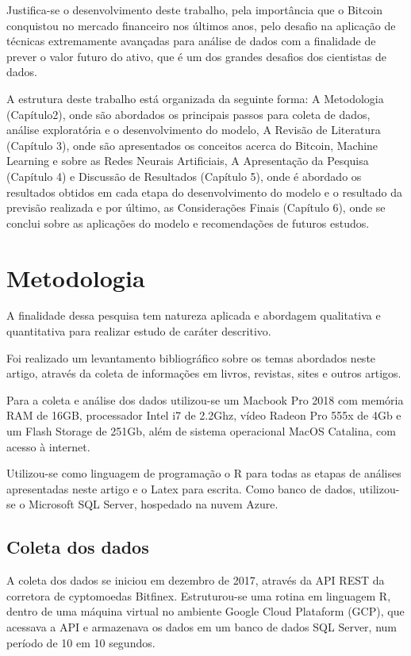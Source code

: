 \documentclass[12pt]{article}
\begin{document}
Justifica-se o desenvolvimento deste trabalho, pela importância que o Bitcoin
conquistou no mercado financeiro nos últimos anos, pelo desafio na aplicação de
técnicas extremamente avançadas para análise de dados com a finalidade de prever 
o valor futuro do ativo, que é um dos grandes desafios dos cientistas de dados.

A estrutura deste trabalho está organizada da seguinte forma: 
A Metodologia (Capítulo2), onde são abordados os principais passos para 
coleta de dados, análise exploratória e o desenvolvimento do modelo, A Revisão 
de Literatura (Capítulo 3), onde são apresentados os conceitos acerca do 
Bitcoin, Machine Learning e sobre as Redes Neurais Artificiais, A Apresentação 
da Pesquisa (Capítulo 4) e Discussão de Resultados (Capítulo 5), onde é abordado os resultados obtidos em cada etapa do desenvolvimento do modelo e o 
resultado da previsão realizada e por último, as Considerações Finais 
(Capítulo 6), onde se conclui sobre as aplicações do modelo e recomendações de 
futuros estudos.


\section{Metodologia} \label{sec:firstpage}

A finalidade dessa pesquisa tem natureza aplicada e abordagem qualitativa e 
quantitativa para realizar estudo de caráter descritivo.

Foi realizado um levantamento bibliográfico sobre os temas abordados neste 
artigo, através da coleta de informações em livros, revistas, sites e outros 
artigos.

Para a coleta e análise dos dados utilizou-se um Macbook Pro 2018 com memória 
RAM de 16GB, processador Intel i7 de 2.2Ghz, vídeo Radeon Pro 555x de 4Gb e um
Flash Storage de 251Gb, além de sistema operacional MacOS Catalina, com acesso
à internet.

Utilizou-se como linguagem de programação o R \cite{r:2020} para todas as etapas 
de análises apresentadas neste artigo e o Latex \cite{goossens93} para escrita. 
Como banco de dados, utilizou-se o Microsoft SQL Server, hospedado na nuvem 
Azure.

\subsection{Coleta dos dados}

A coleta dos dados se iniciou em dezembro de 2017, através da API REST da 
corretora de cyptomoedas Bitfinex. Estruturou-se uma rotina em linguagem R, 
dentro de uma máquina virtual no ambiente Google Cloud Plataform (GCP), 
que acessava a API e armazenava os dados em um banco de dados SQL Server, 
num período de 10 em 10 segundos.
\end{document}
